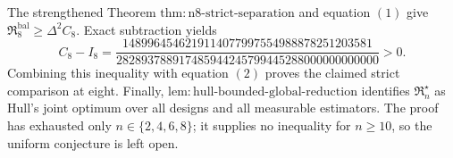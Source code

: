 The strengthened Theorem \(\mathrm{thm{:}n8\mbox{-}strict\mbox{-}separation}\) and equation \((1)\) give
\(
 \mathfrak R_8^{\mathrm{bal}}\geq\Delta^2C_8.
\)
Exact subtraction yields
\[
 C_8-I_8
 =\frac{1489964546219114077997554988878251203581}
 {282893788917485944245799445288000000000000}>0.
\]
Combining this inequality with equation \((2)\) proves the claimed strict comparison at eight.  Finally, \(\mathrm{lem{:}hull\mbox{-}bounded\mbox{-}global\mbox{-}reduction}\) identifies \(\mathfrak R_n^\star\) as Hull's joint optimum over all designs and all measurable estimators.  The proof has exhausted only \(n\in\{2,4,6,8\}\); it supplies no inequality for \(n\geq10\), so the uniform conjecture is left open.
